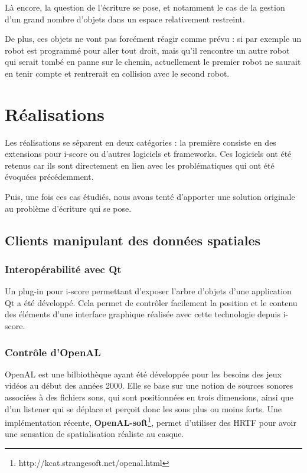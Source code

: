 \documentclass[french,12pt]{article}
\begin{document}
Là encore, la question de l'écriture se pose, et notamment le cas de la gestion d'un grand nombre d'objets dans un espace relativement restreint.

De plus, ces objets ne vont pas forcément réagir comme prévu : si par exemple un robot est programmé pour aller tout droit, mais qu'il rencontre un autre robot qui serait tombé en panne sur le chemin, actuellement le premier robot ne saurait en tenir compte et rentrerait en collision avec le second robot.


\section{Réalisations}
Les réalisations se séparent en deux catégories : la première consiste en des extensions pour i-score ou d'autres logiciels et frameworks. Ces logiciels ont été retenus car ils sont directement en lien avec les problématiques qui ont été évoquées précédemment.

Puis, une fois ces cas étudiés, nous avons tenté d'apporter une solution originale au problème d'écriture qui se pose.

\subsection{Clients manipulant des données spatiales}
\subsubsection{Interopérabilité avec Qt}
Un plug-in pour i-score permettant d'exposer l'arbre d'objets d'une application Qt a été développé. Cela permet de contrôler facilement la position et le contenu des éléments d'une interface graphique réalisée avec cette technologie depuis i-score.

\subsubsection{Contrôle d'OpenAL}
OpenAL est une bilbiothèque ayant été développée pour les besoins des jeux vidéos au début des années 2000. Elle se base sur une notion de sources sonores associées à des fichiers sons, qui sont positionnées en trois dimensions, ainsi que d'un listener qui se déplace et perçoit donc les sons plus ou moins forts. Une implémentation récente, \textbf{OpenAL-soft}\footnote{http://kcat.strangesoft.net/openal.html}, permet d'utiliser des HRTF pour avoir une sensation de spatialisation réaliste au casque.  
\end{document}
